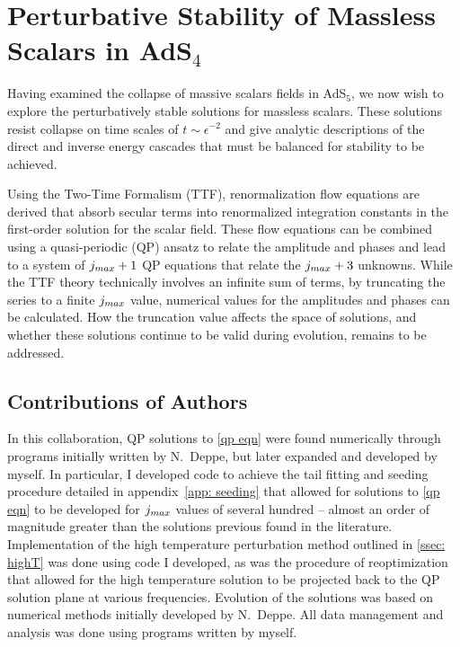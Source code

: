 \documentclass[../PhD.tex]{subfiles}
\begin{document}

\chapter{Perturbative Stability of Massless Scalars in AdS$_4$}
\label{ch: ttf}

Having examined the collapse of massive scalars fields in AdS$_5$, we now wish to explore the perturbatively stable solutions for massless scalars. These solutions resist collapse on time scales of $t \sim \epsilon^{-2}$ and give analytic descriptions of the direct and inverse energy cascades that must be balanced for stability to be achieved.

Using the Two-Time Formalism (TTF), renormalization flow equations are derived that absorb secular terms into renormalized integration constants in the first-order solution for the scalar field. These flow equations can be combined using a quasi-periodic (QP) ansatz to relate the amplitude and phases and lead to a system of $j_{max} + 1$ QP equations that relate the $j_{max} + 3$ unknowns. While the TTF theory technically involves an infinite sum of terms, by truncating the series to a finite $j_{max}$ value, numerical values for the amplitudes and phases can be calculated. How the truncation value affects the space of solutions, and whether these solutions continue to be valid during evolution, remains to be addressed.

\section{Contributions of Authors}

In this collaboration, QP solutions to \eqref{qp eqn} were found numerically through programs initially written by N.~Deppe, but later expanded and developed by myself. In particular, I developed code to achieve the tail fitting and seeding procedure detailed in appendix~\ref{app: seeding} that allowed for solutions to \eqref{qp eqn} to be developed for $j_{max}$ values of several hundred -- almost an order of magnitude greater than the solutions previous found in the literature. Implementation of the high temperature perturbation method outlined in \ref{ssec: highT} was done using code I developed, as was the procedure of reoptimization that allowed for the high temperature solution to be projected back to the QP solution plane at various frequencies. Evolution of the solutions was based on numerical methods initially developed by N.~Deppe. All data management and analysis was done using programs written by myself.
\end{document}
